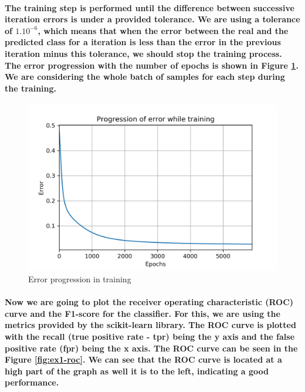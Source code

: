 \documentclass[a4paper]{article}
\begin{document}
\paragraph{The training step is performed until the difference between successive iteration errors is under a provided tolerance. We are using a tolerance of $1.10^{-6}$, which means that when the error between the real and the predicted class for a iteration is less than the error in the previous iteration minus this tolerance, we should stop the training process. The error progression with the number of epochs is shown in Figure \ref{fig:ex1-error}. We are considering the whole batch of samples for each step during the training.}

\begin{figure}[H]
    \centering
    \includegraphics[width=12cm]{error}
    \caption{Error progression in training}
    \label{fig:ex1-error}
\end{figure}

\paragraph{Now we are going to plot the receiver operating characteristic (ROC) curve and the F1-score for the classifier. For this, we are using the metrics provided by the scikit-learn library. The ROC curve is plotted with the recall (true positive rate - tpr) being the y axis and the false positive rate (fpr) being the x axis. The ROC curve can be seen in the Figure \ref{fig:ex1-roc}. We can see that the ROC curve is located at a high part of the graph as well it is to the left, indicating a good performance.}
\end{document}
